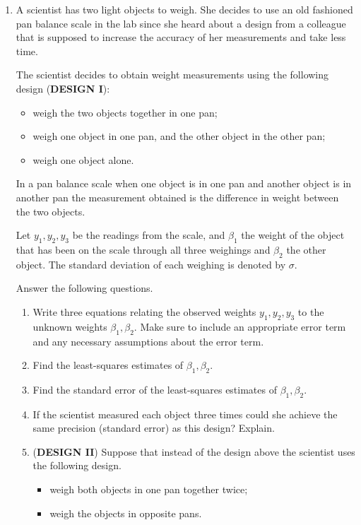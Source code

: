 \documentclass[11pt, oneside]{article}   	%
\begin{document}
\begin{enumerate}

\item A scientist has two light objects to weigh.  She decides to use an old fashioned pan balance scale in the lab since she heard about a design from a colleague that is supposed to increase the accuracy of her measurements and take less time.  

The scientist decides to obtain weight measurements using the following design ({\bf{DESIGN I}}):

\begin{itemize}
\item weigh the two objects together in one pan;
\item weigh one object in one pan, and the other object in the other pan;
\item weigh one object alone.
\end{itemize}

In a pan balance scale when one object is in one pan and another object is in another pan the measurement obtained is the difference in weight between the two objects.

Let $y_1,y_2,y_3$ be the readings from the scale, and $\beta_1$ the weight of the object that has been on the scale through all three weighings and $\beta_2$ the other object. The standard deviation of each weighing is denoted by  $\sigma$.  

Answer the following questions.

\begin{enumerate}

\item Write three equations relating the observed weights $y_1,y_2,y_3$ to the unknown weights $\beta_1,\beta_2$.  Make sure to include an appropriate error term and any necessary assumptions about the error term. 
\item Find the least-squares estimates of $\beta_1,\beta_2$.
\item Find the standard error of the least-squares estimates of $\beta_1,\beta_2$.
\item If the scientist measured each object three times could she achieve the same precision (standard error) as this design?  Explain. 

\item ({\bf DESIGN II}) Suppose that instead of the design above the scientist uses the following design.

\begin{itemize}
\item weigh both objects in one pan together twice;
\item weigh the objects in opposite pans.
\end{itemize}




\end{enumerate}
\end{enumerate}
\end{document}
